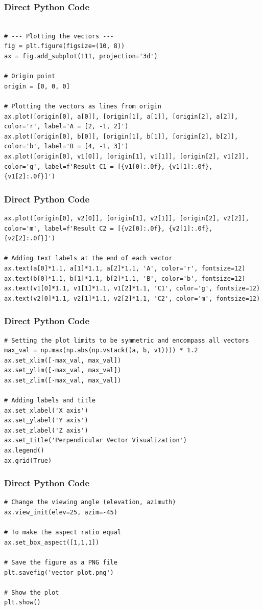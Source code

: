 \documentclass{beamer}
\begin{document}
\begin{frame}[fragile]
\frametitle{Direct Python Code}
\begin{lstlisting}

# --- Plotting the vectors ---
fig = plt.figure(figsize=(10, 8))
ax = fig.add_subplot(111, projection='3d')

# Origin point
origin = [0, 0, 0]

# Plotting the vectors as lines from origin
ax.plot([origin[0], a[0]], [origin[1], a[1]], [origin[2], a[2]], color='r', label='A = [2, -1, 2]')
ax.plot([origin[0], b[0]], [origin[1], b[1]], [origin[2], b[2]], color='b', label='B = [4, -1, 3]')
ax.plot([origin[0], v1[0]], [origin[1], v1[1]], [origin[2], v1[2]], color='g', label=f'Result C1 = [{v1[0]:.0f}, {v1[1]:.0f}, {v1[2]:.0f}]')
\end{lstlisting}
\end{frame}

\begin{frame}[fragile]
\frametitle{Direct Python Code}
\begin{lstlisting}
ax.plot([origin[0], v2[0]], [origin[1], v2[1]], [origin[2], v2[2]], color='m', label=f'Result C2 = [{v2[0]:.0f}, {v2[1]:.0f}, {v2[2]:.0f}]')

# Adding text labels at the end of each vector
ax.text(a[0]*1.1, a[1]*1.1, a[2]*1.1, 'A', color='r', fontsize=12)
ax.text(b[0]*1.1, b[1]*1.1, b[2]*1.1, 'B', color='b', fontsize=12)
ax.text(v1[0]*1.1, v1[1]*1.1, v1[2]*1.1, 'C1', color='g', fontsize=12)
ax.text(v2[0]*1.1, v2[1]*1.1, v2[2]*1.1, 'C2', color='m', fontsize=12)

\end{lstlisting}
\end{frame}

\begin{frame}[fragile]
\frametitle{Direct Python Code}
\begin{lstlisting}
# Setting the plot limits to be symmetric and encompass all vectors
max_val = np.max(np.abs(np.vstack((a, b, v1)))) * 1.2
ax.set_xlim([-max_val, max_val])
ax.set_ylim([-max_val, max_val])
ax.set_zlim([-max_val, max_val])

# Adding labels and title
ax.set_xlabel('X axis')
ax.set_ylabel('Y axis')
ax.set_zlabel('Z axis')
ax.set_title('Perpendicular Vector Visualization')
ax.legend()
ax.grid(True)
\end{lstlisting}
\end{frame}

\begin{frame}[fragile]
\frametitle{Direct Python Code}
\begin{lstlisting}
# Change the viewing angle (elevation, azimuth)
ax.view_init(elev=25, azim=-45)

# To make the aspect ratio equal
ax.set_box_aspect([1,1,1]) 

# Save the figure as a PNG file
plt.savefig('vector_plot.png')

# Show the plot
plt.show()


\end{lstlisting}
\end{frame}
\end{document}

